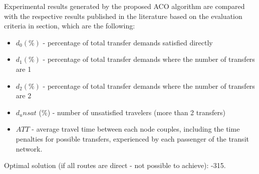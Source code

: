 Experimental results generated by the proposed ACO algorithm are compared with the respective results published in the literature based on the evaluation criteria in section, which are the following:
\begin{itemize}
\item $d_0 (\%)$ - percentage of total transfer demands satisfied directly
\item $d_1 (\%)$ - percentage of total transfer demands where the number of transfers are 1
\item $d_2 (\%)$ - percentage of total transfer demands where the number of transfers are 2
\item $d_unsat$ (\%) - number of unsatisfied travelers (more than 2 transfers)
\item $ATT$  - average travel time between each node couples, including the time penalties for possible transfers, experienced by each passenger of the transit network.
\end{itemize}

Optimal solution (if all routes are direct - not possible to achieve): -315.